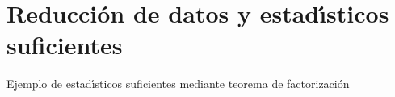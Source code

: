 
\chapter{Reducci\'{o}n de datos y estad\'{\i}sticos suficientes}
\begin{problem}
Ejemplo de estad\'{\i}sticos suficientes mediante teorema de factorizaci\'{o}n
\end{problem}


